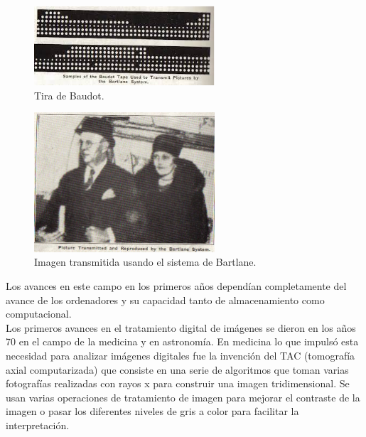 \begin{figure}[h]
\centering
\includegraphics[width=0.6\textwidth]{imagenes/telegrafo}
\caption{Tira de Baudot.}
\label{telegrafo}
\end{figure}

\begin{figure}[h]
\centering
\includegraphics[width=0.6\textwidth]{imagenes/1digital}
\caption{Imagen transmitida usando el sistema de Bartlane.}
\label{1digital}
\end{figure}

Los avances en este campo en los primeros años dependían completamente del avance de los ordenadores y su capacidad tanto de almacenamiento como computacional.\\

Los primeros avances en el tratamiento digital de imágenes se dieron en los años 70 en el campo de la medicina y en astronomía. En medicina lo que impulsó esta necesidad para analizar imágenes digitales fue la invención del TAC (tomografía axial computarizada) que consiste en una serie de algoritmos que toman varias fotografías realizadas con rayos x para construir una imagen tridimensional. Se usan varias operaciones de tratamiento de imagen para mejorar el contraste de la imagen o pasar los diferentes niveles de gris a color para facilitar la interpretación.\\



